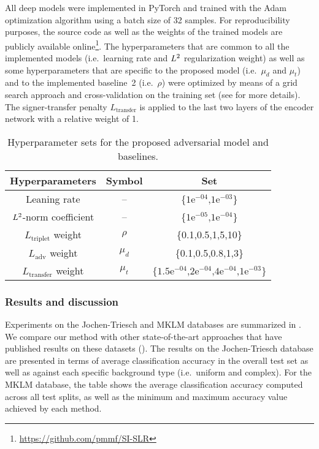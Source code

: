 All deep models were implemented in PyTorch and trained with the Adam optimization algorithm using a batch size of 32 samples. For reproducibility purposes, the source code as well as the weights of the trained models are publicly available online\footnote{\url{https://github.com/pmmf/SI-SLR}}. The hyperparameters that are common to all the implemented models (i.e.\ learning rate and $L^2$ regularization weight) as well as some hyperparameters that are specific to the proposed model (i.e.\ $\mu_d$ and $\mu_t$) and to the implemented baseline~2 (i.e.\ $\rho$) were optimized by means of a grid search approach and cross-validation on the training set (see  for more details). The signer-transfer penalty $L_{\text{transfer}}$ is applied to the last two layers of the encoder network with a relative weight of 1.

\begin{table}[t]
    \centering
    \begin{tabular}{c|c|c}
        Hyperparameters                    & Symbol & Set                \\ \hline
        Leaning rate                                & --      & \{$1\text{e}^{-04}$,$1\text{e}^{-03}$\}             \\
        $L^2$-norm coefficient                              & --       & \{$1\text{e}^{-05}$,$1\text{e}^{-04}$\}             \\
        $L_{\text{triplet}}$ weight                 & $\rho$                & \{0.1,0.5,1,5,10\}                  \\
        $L_{\text{adv}}$ weight                 & $\mu_d$                & \{0.1,0.5,0.8,1,3\}                  \\
        $L_{\text{transfer}}$ weight                 & $\mu_t$                & $\{1.5\text{e}^{-04}$,$2\text{e}^{-04}$,$4\text{e}^{-04}$,$1\text{e}^{-03}\}$
    \end{tabular}
    \caption{Hyperparameter sets for the proposed adversarial model and baselines.}
    \label{tab:hyperparam}
\end{table}

\subsubsection{Results and discussion}
Experiments on the Jochen-Triesch and MKLM databases are summarized in . We compare our method with other state-of-the-art approaches that have published results on these datasets (\citet{Dahmani2014, Just2006, Kelly2010, Marin2014, Ferreira2018}). The results on the Jochen-Triesch database are presented in terms of average classification accuracy in the overall test set as well as against each specific background type (i.e.\ uniform and complex). For the MKLM database, the table shows the average classification accuracy computed across all test splits, as well as the minimum and maximum accuracy value achieved by each method.

